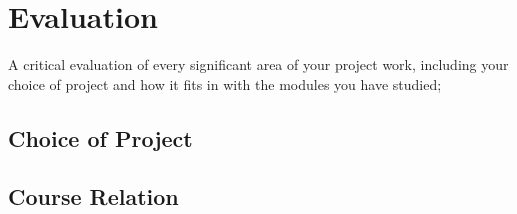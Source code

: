 \section{Evaluation}\label{evaluation}

A critical evaluation of every significant area of your project work,
including your choice of project and how it fits in with the modules you
have studied;

\subsection{Choice of Project}\label{choice-of-project}

\subsection{Course Relation}\label{course-relation}
